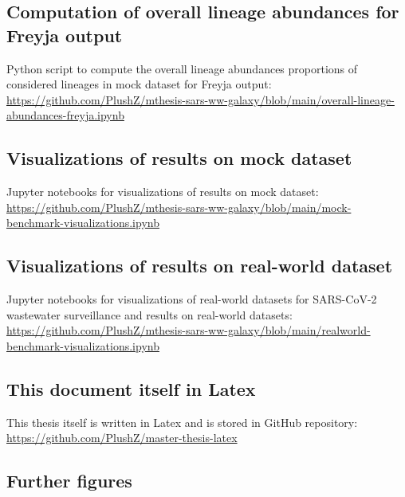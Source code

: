    \subsection{Computation of overall lineage abundances for Freyja output} \label{sec:appendix:recompute-freyja}
    Python script to compute the overall lineage abundances proportions of considered lineages in mock dataset for Freyja output:\\
    \url{https://github.com/PlushZ/mthesis-sars-ww-galaxy/blob/main/overall-lineage-abundances-freyja.ipynb}
    
    \subsection{Visualizations of results on mock dataset} \label{sec:appendix:mock-visualize}
    Jupyter notebooks for visualizations of results on mock dataset: \\
    \url{https://github.com/PlushZ/mthesis-sars-ww-galaxy/blob/main/mock-benchmark-visualizations.ipynb} 
    
    \subsection{Visualizations of results on real-world dataset} \label{sec:appendix:real-visualize}
    Jupyter notebooks for visualizations of real-world datasets for SARS-CoV-2 wastewater surveillance and results on real-world datasets: \\
    \url{https://github.com/PlushZ/mthesis-sars-ww-galaxy/blob/main/realworld-benchmark-visualizations.ipynb}
    
    \subsection{This document itself in Latex} \label{sec:appendix:real-visualize}
    This thesis itself is written in Latex and is stored in GitHub repository: \\
    \url{https://github.com/PlushZ/master-thesis-latex}


    \subsection{Further figures}
